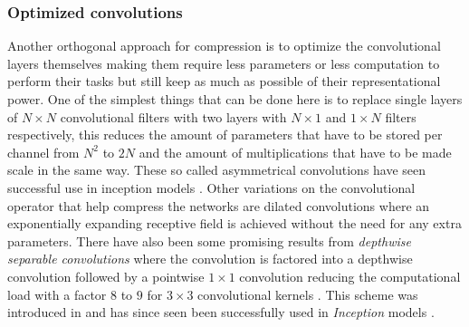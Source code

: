 \documentclass{kththesis}
\newcommand{\bibentry}[1]{\parencite{#1}}
\begin{document}
\subsubsection{Optimized convolutions}
Another orthogonal approach for compression is to optimize the convolutional
layers themselves making them require less parameters or less computation to
perform their tasks but still keep as much as possible of their representational
power. One of the simplest things that can be done here is to replace single
layers of \(N \times N\) convolutional filters with two layers with \(N \times
1\) and \(1 \times N\) filters respectively, this reduces the amount of
parameters that have to be stored per channel from \(N^2\) to \(2N\) and the
amount of multiplications that have to be made scale in the same way. These
so called asymmetrical convolutions have seen successful use in inception models
\bibentry{szegedy2016rethinking}.  
Other variations on the convolutional operator that help compress the networks
are dilated convolutions \bibentry{yu2015multi} where an exponentially expanding
receptive field is achieved without the need for any extra parameters. There
have also been some promising results from \emph{depthwise separable
  convolutions} where the convolution is factored into a depthwise convolution
followed by a pointwise \(1 \times 1\) convolution reducing the computational
load with a factor \(8\) to \(9\) for \(3 \times 3\) convolutional kernels
\bibentry{howard2017mobilenets}. This scheme was introduced in
\bibentry{sifre2014rigid} and has since seen been successfully used in
\emph{Inception} models \bibentry{ioffe2015batch}.  
\end{document}
